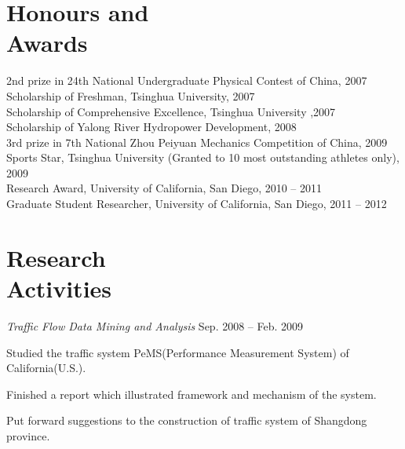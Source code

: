 \documentclass[margin,line]{cv}
\begin{document}
\begin{resume}
	\section{\mysidestyle Honours and\\Awards}

	2nd prize in 24th National Undergraduate Physical Contest of China, 2007 \vspace{1mm}\\%
	Scholarship of Freshman, Tsinghua University, 2007 \vspace{1mm}\\%
	Scholarship of Comprehensive Excellence, Tsinghua University ,2007\vspace{1mm}\\%
	Scholarship of Yalong River Hydropower Development, 2008 \vspace{1mm}\\%
	3rd prize in 7th National Zhou Peiyuan Mechanics Competition of China, 2009 \vspace{1mm}\\%
	Sports Star, Tsinghua University (Granted to 10 most outstanding athletes only), 2009 \vspace{1mm}\\%
	Research Award, University of California, San Diego, 2010 -- 2011  \vspace{1mm}\\%
	Graduate Student Researcher, University of California, San Diego, 2011 -- 2012

	\section{\mysidestyle Research\\Activities}

	\textsl{Traffic Flow Data Mining and Analysis} \hfill Sep. 2008 -- Feb. 2009
	\vspace{-2mm}\\\vspace{-1mm}%
	\begin{list2}
		\item Studied the traffic system PeMS(Performance Measurement System) of California(U.S.).
		\item Finished a report which illustrated framework and mechanism of the system.
		\item Put forward suggestions to the construction of traffic system of Shangdong province.
	\end{list2}


\end{resume}
\end{document}
